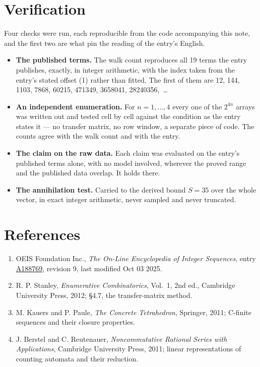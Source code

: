 \documentclass[11pt]{article}
\theoremstyle{definition}
\begin{document}
\section{Verification}

Four checks were run, each reproducible from the code accompanying this note, and the first two are what pin the reading of the entry's English.

\begin{itemize}

\item {\bfseries The published terms.} The walk count reproduces all 19 terms the entry publishes, exactly, in integer arithmetic, with the index taken from the entry's stated offset (1) rather than fitted. The first of them are 12, 144, 1103, 7868, 60215, 471349, 3658041, 28240356,~\dots

\item {\bfseries An independent enumeration.} For $n = 1,\dots,4$ every one of the $2^{4n}$ arrays was written out and tested cell by cell against the condition as the entry states it --- no transfer matrix, no row window, a separate piece of code. The counts agree with the walk count and with the entry.

\item {\bfseries The claim on the raw data.} Each claim was evaluated on the entry's published terms alone, with no model involved, wherever the proved range and the published data overlap. It holds there.

\item {\bfseries The annihilation test.} Carried to the derived bound $S = 35$ over the whole vector, in exact integer arithmetic, never sampled and never truncated.

\end{itemize}

\section{References}

\begin{enumerate}

\item OEIS Foundation Inc., \emph{The On-Line Encyclopedia of Integer Sequences}, entry \href{https://oeis.org/A188769}{A188769}, revision 9, last modified Oct 03 2025.

\item R. P. Stanley, \emph{Enumerative Combinatorics}, Vol.~1, 2nd ed., Cambridge University Press, 2012; \S4.7, the transfer-matrix method.

\item M. Kauers and P. Paule, \emph{The Concrete Tetrahedron}, Springer, 2011; C-finite sequences and their closure properties.

\item J. Berstel and C. Reutenauer, \emph{Noncommutative Rational Series with Applications}, Cambridge University Press, 2011; linear representations of counting automata and their reduction.

\end{enumerate}
\end{document}

